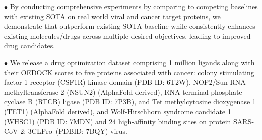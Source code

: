 $\bullet$ By conducting comprehensive experiments
 by comparing to competing baselines
 {with existing SOTA}
on real world 
{viral} and {cancer target}
proteins, we {demonstrate that \algname outperform existing SOTA baseline} 
while consistently enhances existing molecules/drugs across multiple desired objectives, leading to improved drug candidates. 


$\bullet$ We release a drug optimization dataset comprising 1 million ligands along with their OEDOCK scores to five proteins associated with cancer:
colony stimulating factor 1 receptor (CSF1R) kinase domain (PDB ID: 6T2W),
NOP2/Sun RNA methyltransferase 2 (NSUN2) (AlphaFold derived),
RNA terminal phosphate cyclase B (RTCB) ligase (PDB ID: 7P3B),
and Tet methylcytosine dioxygenase 1 (TET1) (AlphaFold derived),
and Wolf-Hirschhorn syndrome candidate 1 (WHSC1) (PDB ID: 7MDN) and 24 high-affinity binding sites on protein SARS-CoV-2: 3CLPro~(PDBID: 7BQY) virus. 










